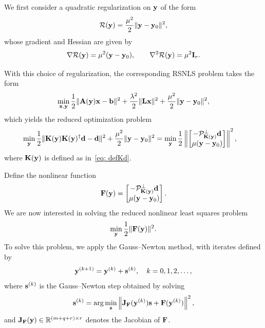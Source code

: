 \documentclass[onefignum,onetabnum]{siamart171218}
\newcommand{\bA}{{\bf A}}
\newcommand{\bF}{{\bf F}}
\newcommand{\bJ}{{\bf J}}
\newcommand{\bK}{{\bf K}}
\newcommand{\bL}{{\bf L}}
\newcommand{\bb}{{\bf b}}
\newcommand{\bd}{{\bf d}}
\newcommand{\bs}{{\bf s}}
\newcommand{\bx}{{\bf x}}
\newcommand{\by}{{\bf y}}
\begin{document}
We first consider a quadratic regularization on $\by$ of the form
\begin{equation*}
\mathcal{R}(\by) = \frac{\mu^2}{2} \| \by - \by_0 \|^2,
\end{equation*}
whose gradient and Hessian are given by
\begin{equation*}
\nabla \mathcal{R}(\by) = \mu^2 (\by - \by_0),
\qquad
\nabla^2 \mathcal{R}(\by) = \mu^2 \mathbf{I}_r.
\end{equation*}

With this choice of regularization, the corresponding RSNLS problem takes the form
\begin{equation*}
\min_{\bx, \by} 
\frac{1}{2}\| \bA(\by) \bx - \bb \|^2
+ \frac{\lambda^2}{2} \| \bL \bx \|^2
+ \frac{\mu^2}{2} \| \by - \by_0 \|^2,
\end{equation*}
which yields the reduced optimization problem
\begin{align*}
\min_{\by}
\frac{1}{2}\| \bK(\by)\bK(\by)^\dagger \bd - \bd \|^2
+ \frac{\mu^2}{2} \| \by - \by_0 \|^2
&=
\min_{\by}\frac{1}{2} \left\| \begin{bmatrix} - \mathcal{P}_{\bK(\by)}^\perp \bd \\ \mu (\by - \by_0) \end{bmatrix} \right\|^2,
\end{align*}
where $\bK(\by)$ is defined as in~\eqref{eq: defKd}.

Define the nonlinear function
\begin{equation*}
\bF(\by) = 
\begin{bmatrix}
- \mathcal{P}_{\bK(\by)}^\perp \bd \\
\mu (\by - \by_0)
\end{bmatrix}.
\end{equation*}
We are now interested in solving the reduced nonlinear least squares problem
\begin{equation*}
\min_{\by} \frac{1}{2}\| \bF(\by) \|^2.
\end{equation*}
To solve this problem, we apply the Gauss–Newton method, with iterates defined by
\begin{equation*}
\by^{(k+1)} = \by^{(k)} + \bs^{(k)}, \quad k = 0, 1, 2, \dots,
\end{equation*}
where $\bs^{(k)}$ is the Gauss–Newton step obtained by solving
\begin{equation*}
\bs^{(k)} = \arg\min_{\bs} \left\| \bJ_{\bF}(\by^{(k)}) \bs + \bF(\by^{(k)}) \right\|^2,
\end{equation*}
and $\bJ_{\bF}(\by) \in \mathbb{R}^{(m+q+r)\times r}$ denotes the Jacobian of $\bF$.
\end{document}
